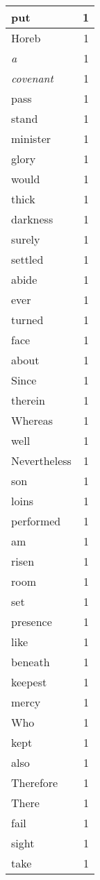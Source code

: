 \begin{center}
\begin{longtable}{l|r}
put & 1 \\ \hline
Horeb & 1 \\ \hline
\emph{a} & 1 \\ \hline
\emph{covenant} & 1 \\ \hline
pass & 1 \\ \hline
stand & 1 \\ \hline
minister & 1 \\ \hline
glory & 1 \\ \hline
would & 1 \\ \hline
thick & 1 \\ \hline
darkness & 1 \\ \hline
surely & 1 \\ \hline
settled & 1 \\ \hline
abide & 1 \\ \hline
ever & 1 \\ \hline
turned & 1 \\ \hline
face & 1 \\ \hline
about & 1 \\ \hline
Since & 1 \\ \hline
therein & 1 \\ \hline
Whereas & 1 \\ \hline
well & 1 \\ \hline
Nevertheless & 1 \\ \hline
son & 1 \\ \hline
loins & 1 \\ \hline
performed & 1 \\ \hline
am & 1 \\ \hline
risen & 1 \\ \hline
room & 1 \\ \hline
set & 1 \\ \hline
presence & 1 \\ \hline
like & 1 \\ \hline
beneath & 1 \\ \hline
keepest & 1 \\ \hline
mercy & 1 \\ \hline
Who & 1 \\ \hline
kept & 1 \\ \hline
also & 1 \\ \hline
Therefore & 1 \\ \hline
There & 1 \\ \hline
fail & 1 \\ \hline
sight & 1 \\ \hline
take & 1 \\ \hline

\end{longtable}
\end{center}
